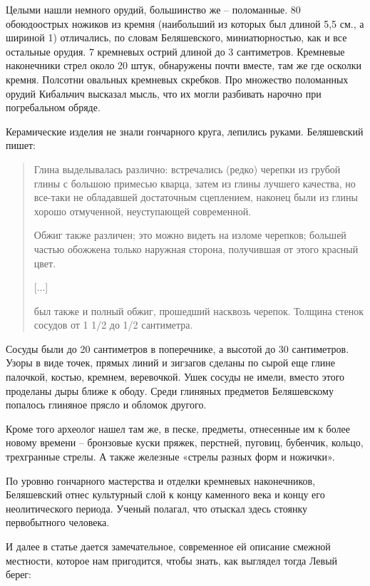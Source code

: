 Целыми нашли немного орудий, большинство же – поломанные. 80 обоюдоострых ножиков из кремня (наибольший из которых был длиной 5,5 см., а шириной 1) отличались, по словам Беляшевского, миниатюрностью, как и все остальные орудия. 7 кремневых острий длиной до 3 сантиметров. Кремневые наконечники стрел около 20 штук, обнаружены почти вместе, там же где осколки кремня. Полсотни овальных кремневых скребков. Про множество поломанных орудий Кибальчич высказал мысль, что их могли разбивать нарочно при погребальном обряде.

Керамические изделия не знали гончарного круга, лепились руками. Беляшевский пишет:

\begin{quotation}
Глина выделывалась различно: встречались (редко) черепки из грубой глины с большою примесью кварца, затем из глины лучшего качества, но все-таки не обладавшей достаточным сцеплением, наконец были из глины хорошо отмученной, неуступающей современной.

Обжиг также различен; это можно видеть на изломе черепков; большей частью обожжена только наружная сторона, получившая от этого красный цвет.

[...]

был также и полный обжиг, прошедший насквозь черепок. Толщина стенок сосудов от 1 1/2 до 1/2 сантиметра.
\end{quotation}

Сосуды были до 20 сантиметров в поперечнике, а высотой до 30 сантиметров. Узоры в виде точек,  прямых линий и зигзагов сделаны по сырой еще глине палочкой, костью, кремнем, веревочкой. Ушек сосуды не имели, вместо этого проделаны дыры ближе к ободу. Среди глиняных предметов Беляшевскому попалось глиняное прясло и обломок другого.

Кроме того археолог нашел там же, в песке, предметы, отнесенные им к более новому времени – бронзовые куски пряжек, перстней, пуговиц, бубенчик, кольцо, трехгранные стрелы. А также железные «стрелы разных форм и ножички».

По уровню гончарного мастерства и отделки кремневых наконечников, Беляшевский отнес культурный слой к концу каменного века и концу его неолитического периода. Ученый полагал, что отыскал здесь стоянку первобытного человека.

И далее в статье дается замечательное, современное ей описание смежной местности, которое нам пригодится, чтобы знать, как выглядел тогда Левый берег:

